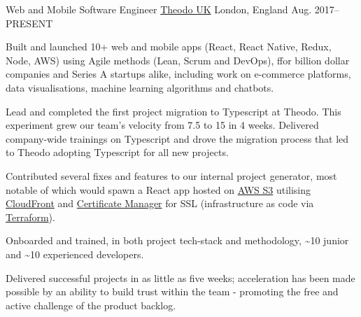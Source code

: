 
\begin{cventries}

  \cventry
    {Web and Mobile Software Engineer}
    {\href{https://www.theodo.co.uk/}{Theodo UK}}
    {London, England}
    {Aug. 2017--\textsc{PRESENT}}
    {
      \begin{cvitems}
        \item Built and launched 10+ web and mobile apps (React, React Native, Redux, Node, AWS) using Agile methods (Lean, Scrum and DevOps), ffor billion dollar companies and Series A startups alike, including work on e-commerce platforms, data visualisations, machine learning algorithms and chatbots.
        \item Lead and completed the first project migration to Typescript at Theodo. This experiment grew our team's velocity from 7.5 to 15 in 4 weeks. Delivered company-wide trainings on Typescript and drove the migration process that led to Theodo adopting Typescript for all new projects.
        \item Contributed several fixes and features to our internal project generator, most notable of which would spawn a React app hosted on \href{https://aws.amazon.com/s3/}{AWS S3} utilising \href{https://aws.amazon.com/cloudfront/}{CloudFront} and \href{https://aws.amazon.com/certificate-manager/}{Certificate Manager} for SSL (infrastructure as code via \href{https://www.terraform.io/}{Terraform}).
        \item Onboarded and trained, in both project tech-stack and methodology, \textasciitilde{}10 junior and \textasciitilde{}10 experienced developers.
        \item Delivered successful projects in as little as five weeks; acceleration has been made possible by an ability to build trust within the team - promoting the free and active challenge of the product backlog.
      \end{cvitems}
    }

\end{cventries}
